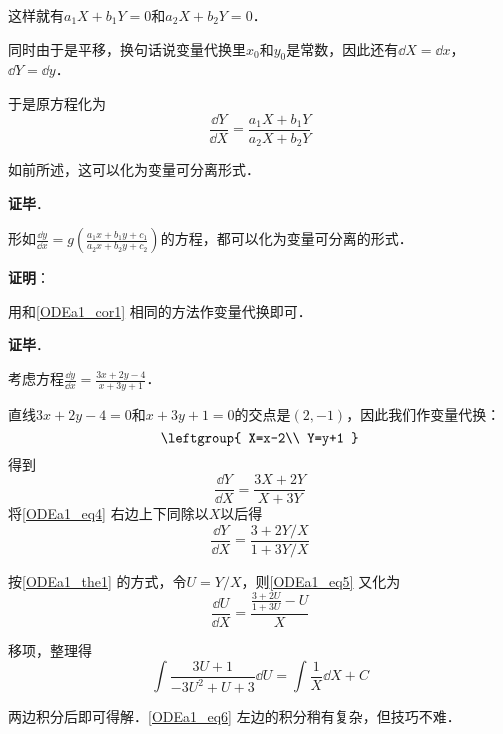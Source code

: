 这样就有$a_1X+b_1Y=0$和$a_2X+b_2Y=0$．

同时由于是平移，换句话说变量代换里$x_0$和$y_0$是常数，因此还有$\dd X=\dd x$，$\dd Y=\dd y$．

于是原方程化为
\begin{equation}
\frac{\dd Y}{\dd X}=\frac{a_1X+b_1Y}{a_2X+b_2Y}
\end{equation}

如前所述，这可以化为变量可分离形式．

\textbf{证毕}．

\begin{corollary}{}
形如$\frac{\dd y}{\dd x}=g(\frac{a_1x+b_1y+c_1}{a_2x+b_2y+c_2})$的方程，都可以化为变量可分离的形式．
\end{corollary}

\textbf{证明}：

用和\autoref{ODEa1_cor1} 相同的方法作变量代换即可．

\textbf{证毕}．





\begin{example}{}
考虑方程$\frac{\dd y}{\dd x}=\frac{3x+2y-4}{x+3y+1}$．

直线$3x+2y-4=0$和$x+3y+1=0$的交点是$(2, -1)$，因此我们作变量代换：
\begin{equation}
\leftgroup{
    X=x-2\\
    Y=y+1
}
\end{equation}
得到
\begin{equation}\label{ODEa1_eq4}
\frac{\dd Y}{\dd X}=\frac{3X+2Y}{X+3Y}
\end{equation}
将\autoref{ODEa1_eq4} 右边上下同除以$X$以后得
\begin{equation}\label{ODEa1_eq5}
\frac{\dd Y}{\dd X}=\frac{3+2Y/X}{1+3Y/X}
\end{equation}

按\autoref{ODEa1_the1} 的方式，令$U=Y/X$，则\autoref{ODEa1_eq5} 又化为
\begin{equation}
\frac{\dd U}{\dd X}=\frac{\frac{3+2U}{1+3U}-U}{X}
\end{equation}

移项，整理得
\begin{equation}\label{ODEa1_eq6}
\int\frac{3U+1}{-3U^2+U+3}\dd U=\int\frac{1}{X}\dd X+C
\end{equation}

两边积分后即可得解．\autoref{ODEa1_eq6} 左边的积分稍有复杂，但技巧不难．

\end{example}








